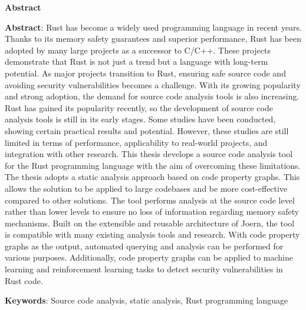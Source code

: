 \begin{center}
\textbf{\large{Abstract}}
\end{center}

\begin{small}

\textbf{Abstract}:
Rust has become a widely used programming language in recent years.
Thanks to its memory safety guarantees and superior performance, Rust has been adopted by many large projects as a successor to C/C++.
These projects demonstrate that Rust is not just a trend but a language with long-term potential.
As major projects transition to Rust, ensuring safe source code and avoiding security vulnerabilities becomes a challenge.
With its growing popularity and strong adoption, the demand for source code analysis tools is also increasing.
Rust has gained its popularity recently, so the development of source code analysis tools is still in its early stages.
Some studies have been conducted, showing certain practical results and potential.
However, these studies are still limited in terms of performance, applicability to real-world projects, and integration with other research.
This thesis develops a source code analysis tool for the Rust programming language with the aim of overcoming these limitations.
The thesis adopts a static analysis approach based on code property graphs.
This allows the solution to be applied to large codebases and be more cost-effective compared to other solutions.
The tool performs analysis at the source code level rather than lower levels to ensure no loss of information regarding memory safety mechanisms.
Built on the extensible and reusable architecture of Joern, the tool is compatible with many existing analysis tools and research.
With code property graphs as the output, automated querying and analysis can be performed for various purposes.
Additionally, code property graphs can be applied to machine learning and reinforcement learning tasks to detect security vulnerabilities in Rust code.

\vspace*{1cm}
\textbf{Keywords}: Source code analysis, static analysis, Rust programming language
\end{small}